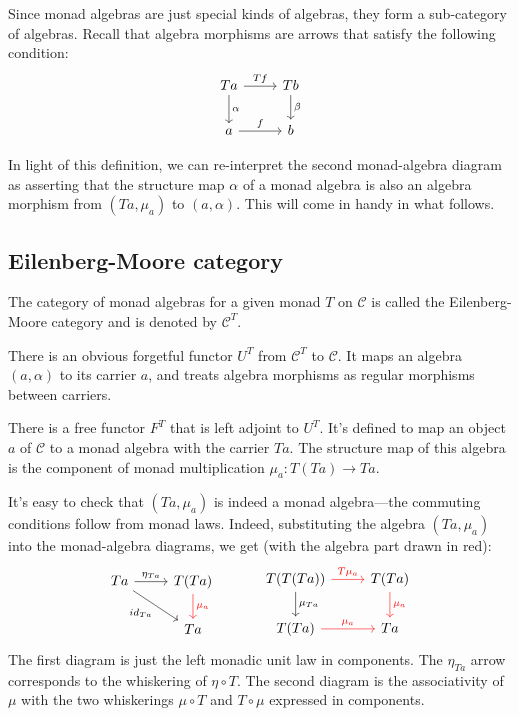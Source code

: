 \documentclass[DaoFP]{subfiles}
\begin{document}
Since monad algebras are just special kinds of algebras, they form a sub-category of algebras. Recall that algebra morphisms are arrows that satisfy the following condition:
\[
 \begin{tikzcd}
 T a 
 \arrow[r, "T f"]
 \arrow[d, "\alpha"]
 & T b
\arrow[d, "\beta"]
 \\
 a
 \arrow[r, "f"]
 & b
  \end{tikzcd}
\]

In light of this definition, we can re-interpret the second monad-algebra diagram as asserting that the structure map $\alpha$ of a monad algebra is also an algebra morphism from $(T a, \mu_a)$ to $(a, \alpha)$. This will come in handy in what follows.

\subsection{Eilenberg-Moore category}

The category of monad algebras for a given monad $T$ on $ \mathcal{C}$ is called the Eilenberg-Moore category and is denoted by $ \mathcal{C}^T$. 

There is an obvious forgetful functor $U^T$ from $ \mathcal{C}^T$ to $ \mathcal{C}$. It maps an algebra $(a, \alpha)$ to its carrier $a$, and treats algebra morphisms as regular morphisms between carriers. 

There is a free functor $F^T$ that is left adjoint to $U^T$. It's defined to map an object $a$ of $ \mathcal{C}$ to a monad algebra with the carrier $T a$. The structure map of this algebra is the component of monad multiplication $\mu_a \colon T(T a) \to T a$. 

It's easy to check that $(T a, \mu_a)$ is indeed a monad algebra---the commuting conditions follow from monad laws. Indeed, substituting the algebra $(T a, \mu_a)$ into the monad-algebra diagrams, we get (with the algebra part drawn in red):
\[
 \begin{tikzcd}
 T a
 \arrow[r, "\eta_{T a}"]
 \arrow[dr, "id_{T a}"']
 & T(T a)
 \arrow[d, red, "\mu_a"]
 \\
 & T a
 \end{tikzcd}
  \hspace{30pt}
 \begin{tikzcd}
T(T(T a))
\arrow[r, red, "T \mu_a "]
\arrow[d, "\mu_{T a}"]
&T(T a)
\arrow[d, red, "\mu_a"]
\\
T (T a)
\arrow[r, red, "\mu_a"]
& T a
 \end{tikzcd}
\]
The first diagram is just the left monadic unit law in components. The $\eta_{T a}$ arrow corresponds to the whiskering of $\eta \circ T$. The second diagram is the associativity of $\mu$ with the two whiskerings $\mu \circ T$ and $T \circ \mu$ expressed in components.
\end{document}
